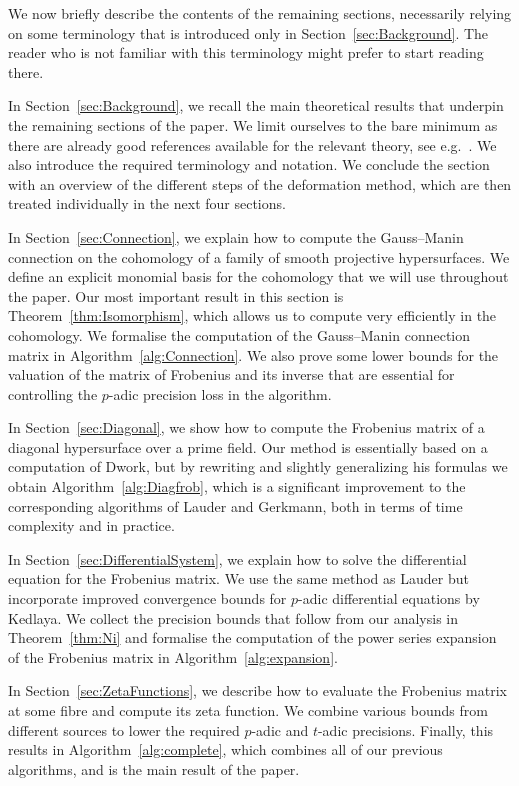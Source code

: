 \documentclass[a4paper,11pt]{article}
\numberwithin{equation}{section}
\theoremstyle{definition}
\begin{document}
We now briefly describe the contents of the remaining sections,
necessarily relying on some terminology that is introduced only 
in Section~\ref{sec:Background}.  The reader who is not familiar 
with this terminology might prefer to start reading there.

In Section~\ref{sec:Background}, we recall the main theoretical results that 
underpin the remaining sections of the paper.  We limit ourselves to the bare 
minimum as there are already good references available for the relevant theory, 
see e.g.~\citep{Kedlaya2012}. We also introduce the required terminology and 
notation. We conclude the section with an overview of the different steps of 
the deformation method, which are then treated individually in the next four 
sections.

In Section~\ref{sec:Connection}, we explain how to compute the Gauss--Manin 
connection on the cohomology of a family of smooth projective hypersurfaces. 
We define an explicit monomial basis for the cohomology that we will use 
throughout the paper. Our most important result in this section
is Theorem~\ref{thm:Isomorphism}, which allows us to compute very efficiently 
in the cohomology. We formalise the computation of the Gauss--Manin connection 
matrix in Algorithm~\ref{alg:Connection}. We also prove some lower bounds for 
the valuation of the matrix of Frobenius and its inverse that are essential 
for controlling the $p$-adic precision loss in the algorithm.

In Section~\ref{sec:Diagonal}, we show how to compute the Frobenius matrix of
a diagonal hypersurface over a prime field. Our method is essentially based 
on a computation of Dwork, but by rewriting and slightly generalizing his formulas we 
obtain Algorithm~\ref{alg:Diagfrob}, which is a significant improvement to the 
corresponding algorithms of Lauder and Gerkmann, both in terms of time complexity 
and in practice.

In Section~\ref{sec:DifferentialSystem}, we explain how to solve the 
differential equation for the Frobenius matrix. We use the same method as 
Lauder but incorporate improved convergence bounds for $p$-adic differential 
equations by Kedlaya. We collect the precision bounds that follow from our 
analysis in Theorem~\ref{thm:Ni} and formalise the computation of the power 
series expansion of the Frobenius matrix in Algorithm~\ref{alg:expansion}.

In Section~\ref{sec:ZetaFunctions}, we describe how to evaluate the Frobenius 
matrix at some fibre and compute its zeta function. We combine various bounds 
from different sources to lower the required $p$-adic and $t$-adic precisions. 
Finally, this results in Algorithm~\ref{alg:complete}, which combines all of 
our previous algorithms, and is the main result of the paper.
\end{document}
